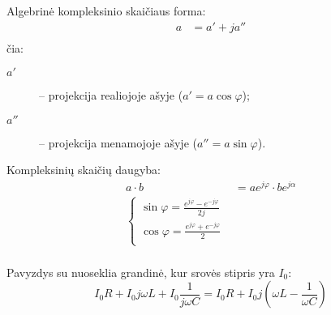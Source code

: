 Algebrinė kompleksinio skaičiaus forma:
\begin{align*}
  a &= a' + j a'' \\
\end{align*}
čia:
\begin{description}
  \item[$a'$] – projekcija realiojoje ašyje ($a' = a \cos \varphi$);
  \item[$a''$] – projekcija menamojoje ašyje ($a'' = a \sin \varphi$).
\end{description}

Kompleksinių skaičių daugyba:
\begin{align*}
  a \cdot b
  &= a e^{j\varphi} \cdot b e^{j\alpha} \\
  \begin{cases}
    \sin \varphi = \frac{e^{j\varphi} - e^{-j\varphi}}{2j} \\
    \cos \varphi = \frac{e^{j\varphi} + e^{-j\varphi}}{2} \\
  \end{cases} \\
\end{align*}

Pavyzdys su nuoseklia grandinė, kur srovės stipris yra $I_{0}$:
\begin{equation*}
  I_{0} R + I_{0} j \omega L + I_{0} \frac{1}{j \omega C} =
  I_{0} R + I_{0} j \left( \omega L - \frac{1}{\omega C} \right)
\end{equation*}
